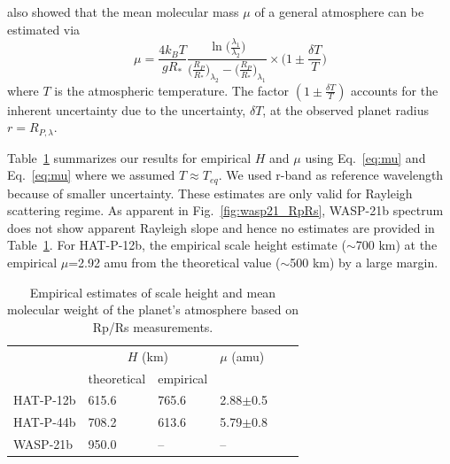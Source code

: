 \cite{Benneke2012} also showed that the mean molecular mass $\mu$ of a general atmosphere can be estimated via
\begin{equation}
\label{eq:mu}
\mu =\frac{4k_BT}{gR_*}\frac{\ln \Big(\frac{\lambda_1}{\lambda_2}\Big)}{\Big(\frac{R_P}{R_*}\Big)_{\lambda_2} -\Big(\frac{R_P}{R_*}\Big)_{\lambda_1}} \times \Big(1\pm\frac{\delta T}{T}\Big)
\end{equation}
where $T$ is the atmospheric temperature. The factor $(1\pm \frac{\delta T}{T})$ accounts for the inherent uncertainty due to the uncertainty, $\delta T$, at the observed planet radius $r = R_{P,\lambda}$. %

Table~\ref{tab:mu} summarizes our results for empirical $H$ and $\mu$ using Eq.~\ref{eq:mu} and Eq.~\ref{eq:mu} where we assumed $T\approx T_{eq}$. We used r-band as reference wavelength because of smaller uncertainty. These estimates are only valid for Rayleigh scattering regime. As apparent in Fig.~\ref{fig:wasp21_RpRs}, WASP-21b spectrum does not show apparent Rayleigh slope and hence no estimates are provided in Table~\ref{tab:mu}. For HAT-P-12b, the empirical scale height estimate ($\sim$700 km) at the empirical $\mu$=2.92 amu from the theoretical value ($\sim$500 km) by a large margin. 

\begin{table}
\centering
\caption{Empirical estimates of scale height and mean molecular weight of the planet's atmosphere based on Rp/Rs measurements.}
\label{tab:mu}
\begin{tabular}{llllll} 
\hline
          &\multicolumn{2}{c}{$H$ (km)}& $\mu$ (amu) \\ %
          &  theoretical & empirical & & \\
\hline
HAT-P-12b & 615.6 & 765.6 & 2.88$\pm$0.5 \\ %
HAT-P-44b & 708.2 & 613.6 & 5.79$\pm$0.8 \\ %
WASP-21b  & 950.0 & -- &-- \\ %
\hline
\end{tabular}
\end{table}


